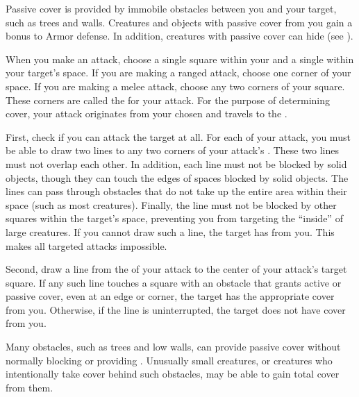             \label{Passive Cover} Passive cover is provided by immobile obstacles between you and your target, such as trees and walls.
            Creatures and objects with passive cover from you gain a  bonus to Armor defense.
            In addition, creatures with passive cover can hide (see ).


            When you make an attack, choose a single square within your  and a single  within your target's space.
            If you are making a ranged attack, choose one corner of your space.
            If you are making a melee attack, choose any two corners of your square.
            These corners are called the  for your attack.
            For the purpose of determining cover, your attack originates from your chosen  and travels to the .

            First, check if you can attack the target at all.
            For each  of your attack, you must be able to draw two lines to any two corners of your attack's .
            These two lines must not overlap each other.
            In addition, each line must not be blocked by solid objects, though they can touch the edges of spaces blocked by solid objects.
            The lines can pass through obstacles that do not take up the entire area within their space (such as most creatures).
            Finally, the line must not be blocked by other squares within the target's space, preventing you from targeting the ``inside'' of large creatures.
            If you cannot draw such a line, the target has  from you.
            This makes all targeted attacks impossible.

            Second, draw a line from the  of your attack to the center of your attack's target square.
            If any such line touches a square with an obstacle that grants active or passive cover, even at an edge or corner, the target has the appropriate cover from you.
            Otherwise, if the line is uninterrupted, the target does not have cover from you.

             Many obstacles, such as trees and low walls, can provide passive cover without normally blocking  or providing .
            Unusually small creatures, or creatures who intentionally take cover behind such obstacles, may be able to gain total cover from them.

